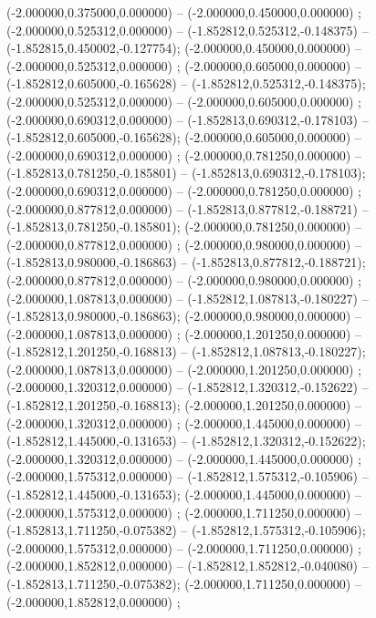 (-2.000000,0.375000,0.000000) -- (-2.000000,0.450000,0.000000) ;
 (-2.000000,0.525312,0.000000) -- (-1.852812,0.525312,-0.148375) -- (-1.852815,0.450002,-0.127754);
 (-2.000000,0.450000,0.000000) -- (-2.000000,0.525312,0.000000) ;
 (-2.000000,0.605000,0.000000) -- (-1.852812,0.605000,-0.165628) -- (-1.852812,0.525312,-0.148375);
 (-2.000000,0.525312,0.000000) -- (-2.000000,0.605000,0.000000) ;
 (-2.000000,0.690312,0.000000) -- (-1.852813,0.690312,-0.178103) -- (-1.852812,0.605000,-0.165628);
 (-2.000000,0.605000,0.000000) -- (-2.000000,0.690312,0.000000) ;
 (-2.000000,0.781250,0.000000) -- (-1.852813,0.781250,-0.185801) -- (-1.852813,0.690312,-0.178103);
 (-2.000000,0.690312,0.000000) -- (-2.000000,0.781250,0.000000) ;
 (-2.000000,0.877812,0.000000) -- (-1.852813,0.877812,-0.188721) -- (-1.852813,0.781250,-0.185801);
 (-2.000000,0.781250,0.000000) -- (-2.000000,0.877812,0.000000) ;
 (-2.000000,0.980000,0.000000) -- (-1.852813,0.980000,-0.186863) -- (-1.852813,0.877812,-0.188721);
 (-2.000000,0.877812,0.000000) -- (-2.000000,0.980000,0.000000) ;
 (-2.000000,1.087813,0.000000) -- (-1.852812,1.087813,-0.180227) -- (-1.852813,0.980000,-0.186863);
 (-2.000000,0.980000,0.000000) -- (-2.000000,1.087813,0.000000) ;
 (-2.000000,1.201250,0.000000) -- (-1.852812,1.201250,-0.168813) -- (-1.852812,1.087813,-0.180227);
 (-2.000000,1.087813,0.000000) -- (-2.000000,1.201250,0.000000) ;
 (-2.000000,1.320312,0.000000) -- (-1.852812,1.320312,-0.152622) -- (-1.852812,1.201250,-0.168813);
 (-2.000000,1.201250,0.000000) -- (-2.000000,1.320312,0.000000) ;
 (-2.000000,1.445000,0.000000) -- (-1.852812,1.445000,-0.131653) -- (-1.852812,1.320312,-0.152622);
 (-2.000000,1.320312,0.000000) -- (-2.000000,1.445000,0.000000) ;
 (-2.000000,1.575312,0.000000) -- (-1.852812,1.575312,-0.105906) -- (-1.852812,1.445000,-0.131653);
 (-2.000000,1.445000,0.000000) -- (-2.000000,1.575312,0.000000) ;
 (-2.000000,1.711250,0.000000) -- (-1.852813,1.711250,-0.075382) -- (-1.852812,1.575312,-0.105906);
 (-2.000000,1.575312,0.000000) -- (-2.000000,1.711250,0.000000) ;
 (-2.000000,1.852812,0.000000) -- (-1.852812,1.852812,-0.040080) -- (-1.852813,1.711250,-0.075382);
 (-2.000000,1.711250,0.000000) -- (-2.000000,1.852812,0.000000) ;
